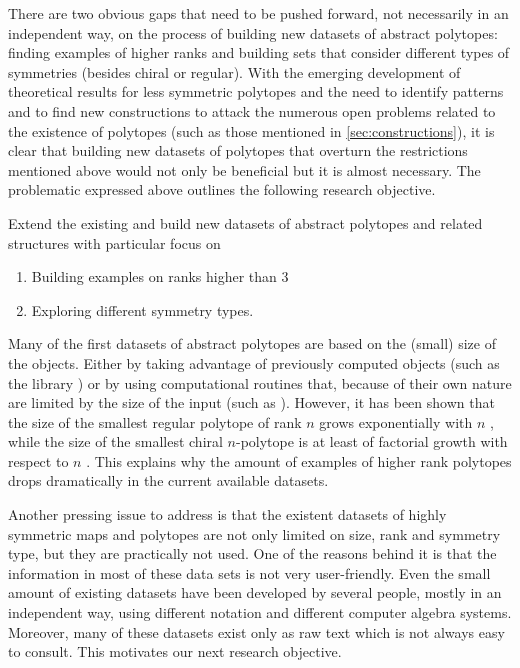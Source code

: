\documentclass[a4paper,12pt,english]{article}
\begin{document}
There are two obvious gaps that need to be pushed forward, not necessarily in an independent way, on the process of building new datasets of abstract polytopes: finding examples of higher ranks and building sets that consider different types of symmetries (besides chiral or regular).
With the emerging development of theoretical results for less symmetric polytopes and the need to identify patterns and to find new constructions to attack the numerous open problems related to the existence of polytopes (such as those mentioned in \cref{sec:constructions}), it is clear that building new datasets of polytopes that overturn the restrictions mentioned above would not only be beneficial but it is almost necessary.
The problematic expressed above outlines the following research objective.

\begin{obj}\label{obj:datasets}
  Extend the existing and build new datasets of abstract polytopes and related structures with particular focus on
  \begin{enumerate}[label=\textit{(\roman*)}, noitemsep]
    \item Building examples on ranks higher than $3$
    \item Exploring different symmetry types.
  \end{enumerate}
\end{obj}

Many of the first datasets of abstract polytopes are based on the (small) size of the objects.
Either by taking advantage of previously computed objects (such as the library \smallgrp{}) or by using computational routines that, because of their own nature are limited by the size of the input (such as  \lins).
However, it has been shown that the size of the smallest regular polytope of rank $n$ grows exponentially with $n$ \cite{Conder2013_SmallestRegularPolytopes}, while the size of the smallest chiral $n$-polytope is at least of factorial growth with respect to $n$ \cite{Cunningham2017_NonFlatRegular}.
This explains why the amount of examples of higher rank polytopes drops dramatically in the current available datasets.

Another pressing issue to address is that the existent datasets of highly symmetric maps and polytopes are not only limited on size, rank and symmetry type, but they are practically not used.
One of the reasons behind it is that the information in most of these data sets is not very user-friendly.
Even the small amount of existing datasets have been developed by several people, mostly in an independent way, using different notation and different computer algebra systems.
Moreover, many of these datasets exist only as raw text which is not always easy to consult.
This motivates our next research objective.
\end{document}
